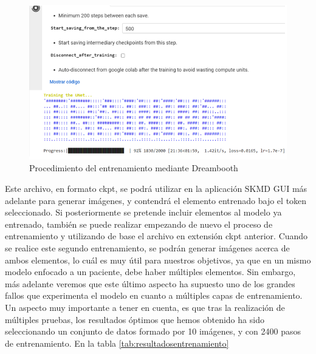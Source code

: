 \begin{figure}[h]
	\centering
	\includegraphics[width = 1
	\textwidth]{Imagenes/Vectorial/dreambooth.png}
	\caption{Procedimiento del entrenamiento mediante Dreambooth}
	\label{fig:dreambooth}
\end{figure}

Este archivo, en formato ckpt, se podrá utilizar en la aplicación SKMD GUI más adelante para generar imágenes, y contendrá el elemento entrenado bajo el token seleccionado. Si posteriormente se pretende incluir elementos al modelo ya entrenado, también se puede realizar empezando de nuevo el proceso de entrenamiento y utilizando de base el archivo en extensión ckpt anterior. Cuando se realice este segundo entrenamiento, se podrán generar imágenes acerca de ambos elementos, lo cuál es muy útil para nuestros objetivos, ya que en un mismo modelo enfocado a un paciente, debe haber múltiples elementos. Sin embargo, más adelante veremos que este último aspecto ha supuesto uno de los grandes fallos que experimenta el modelo en cuanto a múltiples capas de entrenamiento. \\

Un aspecto muy importante a tener en cuenta, es que tras la realización de múltiples pruebas, los resultados óptimos que hemos obtenido ha sido seleccionando un conjunto de datos formado por 10 imágenes, y con 2400 pasos de entrenamiento. En la tabla \ref{tab:resultadosentrenamiento}\\



